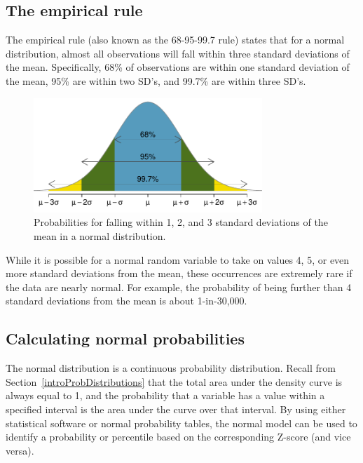 
\subsection{The empirical rule}\label{empiricalRule}

The empirical rule (also known as the 68-95-99.7 rule) states that for a normal distribution, almost all observations will fall within three standard deviations of the mean. Specifically, 68\% of observations are within one standard deviation of the mean, 95\% are within two SD's, and 99.7\% are within three SD's. 

\begin{figure}[h!]
	\centering
	\includegraphics[height=1.7in]{ch_distributions_oi_biostat/figures/6895997/6895997}
	\caption{Probabilities for falling within 1, 2, and 3 standard deviations of the mean in a normal distribution.}
	\label{6895997}
\end{figure}

While it is possible for a normal random variable to take on values 4, 5, or even more standard deviations from the mean, these occurrences are extremely rare if the data are nearly normal. For example, the probability of being further than 4 standard deviations from the mean is about 1-in-30,000.

\subsection{Calculating normal probabilities}

The normal distribution is a continuous probability distribution. Recall from Section~\ref{introProbDistributions} that the total area under the density curve is always equal to 1, and the probability that a variable has a value within a specified interval is the area under the curve over that interval. By using either statistical software or normal probability tables, the normal model can be used to identify a probability or percentile based on the corresponding Z-score (and vice versa). 

